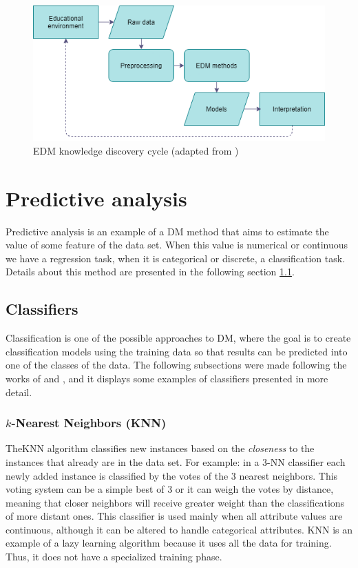 \begin{figure}[htb]
	\centering
  	\includegraphics[scale=.7]{Imagens/edm.png}
  	\caption{EDM knowledge discovery cycle (adapted from \cite{linan2015educational})}
  	\label{fig:edm}
\end{figure}

\section{Predictive analysis}

Predictive analysis is an example of a DM method that aims to estimate the value of some feature of the data set. When this value is numerical or continuous we have a regression task, when it is categorical or discrete, a classification task. Details about this method are presented in the following section \ref{sc:class}.

\subsection{Classifiers}
\label{sc:class}

Classification is one of the possible approaches to DM, where the goal is to create classification models using the training data so that results can be predicted into one of the classes of the data. The following subsections were made following the works of \cite{bramer2007principles} and \cite{larose2006data}, and it displays some examples of classifiers presented in more detail.

\subsubsection{$k$-Nearest Neighbors (KNN)}

TheKNN algorithm classifies new instances based on the \emph{closeness} to the instances that already are in the data set. For example: in a 3-NN classifier each newly added instance is classified by the votes of the 3 nearest neighbors. This voting system can be a simple best of 3 or it can weigh the votes by distance, meaning that closer neighbors will receive greater weight than the classifications of more distant ones. This classifier is used mainly when all attribute values are continuous, although it can be altered to handle categorical attributes. 
KNN is an example of a lazy learning algorithm because it uses all the data for training. Thus, it does not have a specialized training phase.

